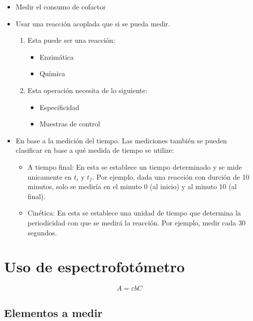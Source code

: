 \begin{itemize}
    \item Medir el consumo de cofactor
    \item Usar una reacción acoplada que si se pueda medir.
        \begin{enumerate}
            \item Esta puede ser una reacción:
                \begin{itemize}
                    \item Enzimática
                    \item Química
                \end{itemize}
                
            \item Esta operación necesita de lo siguiente:
                \begin{itemize}
                    \item Especificidad
                    \item Muestras de control
                \end{itemize}
        \end{enumerate}

    \item En base a la medición del tiempo. Las mediciones también se pueden clasificar en base a qué medida de tiempo se utilize:
        \begin{itemize}
            \item A tiempo final: En esta se establece un tiempo determinado y se mide unicamente en $t_i$ y $t_f$. Por ejemplo, dada una reacción con durción de 10 minutos, solo se mediría en el minuto 0 (al inicio) y al minuto 10 (al final).
            \item Cinética: En esta se establece una unidad de tiempo que determina la periodicidad con que se medirá la reacción. Por ejemplo, medir cada 30 segundos. 
        \end{itemize}
\end{itemize}

\section{Uso de espectrofotómetro}

\begin{equation}
    A = \varepsilon b C
\end{equation}

\subsection{Elementos a medir}

